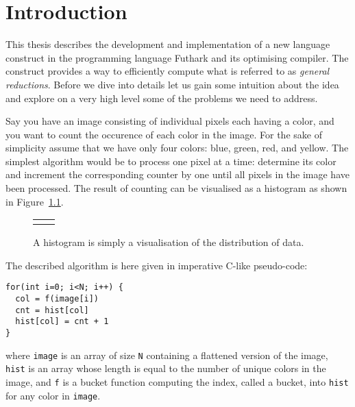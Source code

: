 \chapter{Introduction}


This thesis describes the development and implementation of
a new language construct in the programming language Futhark
and its optimising compiler. The construct provides a way to
efficiently compute what is referred to as \emph{general
  reductions}. Before we dive into details let us gain some
intuition about the idea and explore on a very high level
some of the problems we need to address. 

Say you have an image consisting of individual pixels each
having a color, and you want to count the occurence of each
color in the image. For the sake of simplicity assume that
we have only four colors: blue, green, red, and yellow. The
simplest algorithm would be to process one pixel at a time:
determine its color and increment the corresponding counter
by one until all pixels in the image have been
processed. The result of counting can be visualised as a
histogram as shown in Figure~\ref{fig:problem}.
%
\begin{figure}
\begin{center}
\begin{tabular}{cc}
 & 
\end{tabular}
\caption{A histogram is simply a visualisation of the
  distribution of data.}
\label{fig:problem}
\end{center}
\end{figure}
%

The described algorithm is here given in imperative C-like
pseudo-code:
%
\begin{lstlisting}
for(int i=0; i<N; i++) {
  col = f(image[i])
  cnt = hist[col]
  hist[col] = cnt + 1
}
\end{lstlisting}
%
where \texttt{image} is an array of size \texttt{N}
containing a flattened version of the image, \texttt{hist}
is an array whose length is equal to the number of unique
colors in the image, and \texttt{f} is a bucket function
computing the index, called a bucket, into \texttt{hist} for
any color in \texttt{image}.

